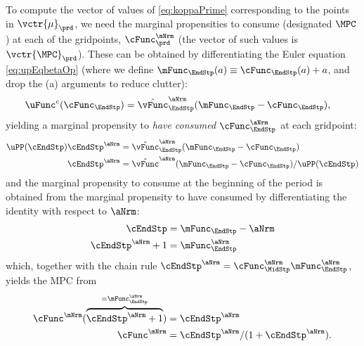 To compute the vector of values of \eqref{eq:koppaPrime} corresponding
to the points in $\vctr{\mu}_{\prd}$, we need the marginal propensities to
consume (designated $\MPC$) at each of the gridpoints,
$\cFunc^{\mNrm}_{\prd}$ (the vector of such values is
$\vctr{\MPC}_{\prd}$).  These can be obtained by differentiating the
Euler equation \eqref{eq:upEqbetaOp} (where we define
$\mFunc_{\EndStp}({a}) \equiv \cFunc_{\EndStp}({a})+{a}$, and drop the (a) arguments to reduce clutter):
\begin{equation}\begin{gathered}\begin{aligned}
      \uFunc^{{c}}({\cFunc}_{\EndStp})   & = \hat{\vFunc}_{\EndStp}^{\aNrm}(\mFunc_{\EndStp}-{\cFunc}_{\EndStp}),
    \end{aligned}\end{gathered}\end{equation}
yielding a marginal propensity to
\textit{have consumed} $\cFunc_{\EndStp}^{\aNrm}$ at each gridpoint:
\begin{equation}\begin{gathered}\begin{aligned}
      \uPP(\cEndStp)\cEndStp^{\aNrm}  & = \hat{\vFunc}_{\EndStp}^{\aNrm}(\mFunc_{\EndStp}-{\cFunc}_{\EndStp})
      \\ \cEndStp^{\aNrm}  & = \hat{\vFunc}^{\aNrm}(\mFunc_{\EndStp}-{\cFunc}_{\EndStp})/\uPP(\cEndStp)
    \end{aligned}\end{gathered}\end{equation}
and the marginal propensity to consume at the beginning of the period is obtained from the marginal propensity to have consumed by differentiating the identity with respect to $\aNrm$:
\begin{equation*}\begin{gathered}\begin{aligned}
      \cEndStp  & = \mFunc_{\EndStp} - \aNrm
      \\ \cEndStp^{\aNrm}+1  & = \mFunc_{\EndStp}^{\aNrm}
    \end{aligned}\end{gathered}\end{equation*}
which, together with the chain rule $\cEndStp^{\aNrm}  = \cFunc^{\mNrm}_{\MidStp}\mFunc_{\EndStp}^{\aNrm}$, yields the MPC from
\begin{equation}\begin{gathered}\begin{aligned}
      \cFunc^{\mNrm}(\overbrace{\cEndStp^{\aNrm}+1}^{=\mFunc_{\EndStp}^{\aNrm}})  & = \cEndStp^{\aNrm}
      \\ \cFunc^{\mNrm}  & = \cEndStp^{\aNrm}/(1+\cEndStp^{\aNrm}) \label{eq:MPCfromMPTHC}.
    \end{aligned}\end{gathered}\end{equation}



